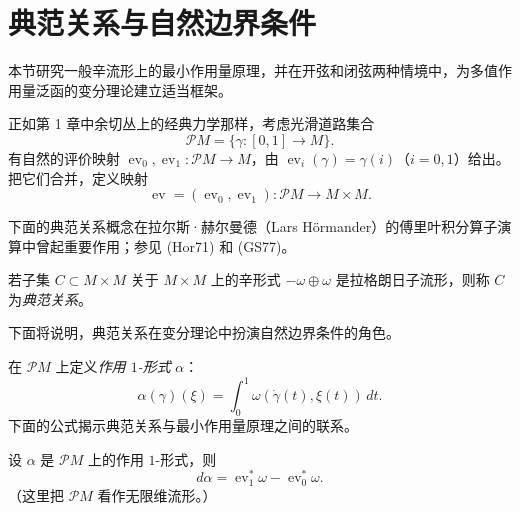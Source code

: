 \section{典范关系与自然边界条件}
\label{sec:canonical-relation-natural-boundary}

本节研究一般辛流形上的最小作用量原理，并在开弦和闭弦两种情境中，为多值作用量泛函的变分理论建立适当框架。

正如第 1 章中余切丛上的经典力学那样，考虑光滑道路集合
\[
 \mathcal PM=\{\gamma:[0,1]\to M\}.
\]
有自然的评价映射
$\operatorname{ev}_0,\operatorname{ev}_1:\mathcal PM\to M$，由
$\operatorname{ev}_i(\gamma)=\gamma(i)$（$i=0,1$）给出。把它们合并，定义映射
\[
 \operatorname{ev}=(\operatorname{ev}_0,\operatorname{ev}_1):
 \mathcal PM\longrightarrow M\times M.
\]

下面的典范关系概念在拉尔斯·赫尔曼德（Lars Hörmander）的傅里叶积分算子演算中曾起重要作用；参见 (Hor71) 和 (GS77)。

\begin{definition}[典范关系]\label{def:canonical-relation}
若子集 $C\subset M\times M$ 关于 $M\times M$ 上的辛形式
$-\omega\oplus\omega$ 是拉格朗日子流形，则称 $C$ 为\emph{典范关系}。
\end{definition}

下面将说明，典范关系在变分理论中扮演自然边界条件的角色。

在 $\mathcal PM$ 上定义\emph{作用 $1$-形式} $\alpha$：
\begin{equation}
 \alpha(\gamma)(\xi)=\int_0^1\omega(\dot\gamma(t),\xi(t))\,dt.
 \label{eq:path-space-action-one-form}
\end{equation}
下面的公式揭示典范关系与最小作用量原理之间的联系。

\begin{proposition}\label{prop:action-one-form-differential}
设 $\alpha$ 是 $\mathcal PM$ 上的作用 $1$-形式，则
\begin{equation}
 d\alpha=\operatorname{ev}_1^*\omega-\operatorname{ev}_0^*\omega.
 \label{eq:action-one-form-boundary-differential}
\end{equation}
（这里把 $\mathcal PM$ 看作无限维流形。）
\end{proposition}

